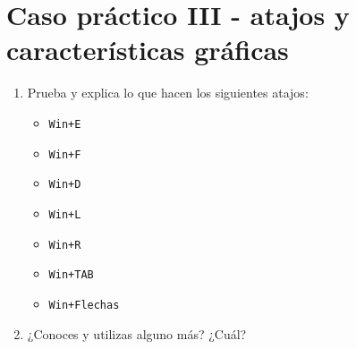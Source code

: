 \documentclass[11pt]{article}
\begin{document}
\section{Caso práctico III - atajos y características gráficas}
\label{sec:org07acbcd}
\begin{enumerate}
\item Prueba y explica lo que hacen los siguientes atajos:
\begin{itemize}
\item \texttt{Win+E}
\item \texttt{Win+F}
\item \texttt{Win+D}
\item \texttt{Win+L}
\item \texttt{Win+R}
\item \texttt{Win+TAB}
\item \texttt{Win+Flechas}
\end{itemize}
\item ¿Conoces y utilizas alguno más? ¿Cuál?
\end{enumerate}
\end{document}
